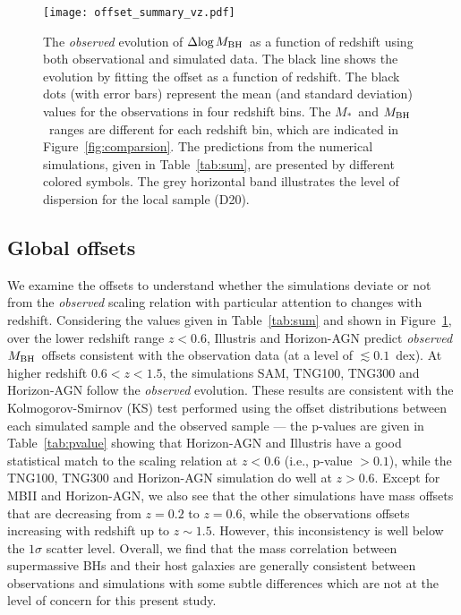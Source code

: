 \documentclass[twocolumn]{aastex631}
\def\smass{{$M_*$}}
\def\mbh{$M_{\rm BH}$}
\begin{document}
\begin{figure}
\centering
\texttt{[image: offset\_summary\_vz.pdf]}
\caption{\label{fig:offsets_vz} 
The {\it observed} evolution of $\Delta{\rm log}$\mbh\ as a function of redshift using both observational and simulated data. The black line shows the evolution by fitting the offset as a function of redshift. The black dots (with error bars) represent the mean (and standard deviation) values for the observations in four redshift bins. The \smass\ and \mbh\ ranges are different for each redshift bin, which are indicated in Figure~\ref{fig:comparsion}. The predictions from the numerical simulations, given in Table~\ref{tab:sum}, are presented by different colored symbols. The grey horizontal band illustrates the level of dispersion for the local sample (D20).
}
\end{figure} 

\subsection{Global offsets}\label{subsec:offset}
We examine the offsets to understand whether the simulations deviate or not from the {\it observed} scaling relation with particular attention to changes with redshift. Considering the values given in Table~\ref{tab:sum} and shown in Figure~\ref{fig:offsets_vz}, over the lower redshift range $z<0.6$, Illustris and Horizon-AGN predict {\it observed} \mbh\ offsets consistent with the observation data (at a level of $\lesssim0.1$~dex). At higher redshift $0.6<z<1.5$, the simulations SAM, TNG100, TNG300 and Horizon-AGN follow the {\it observed} evolution. These results are consistent with the Kolmogorov-Smirnov (KS) test performed using the offset distributions between each simulated sample and the observed sample --- the p-values are given in Table~\ref{tab:pvalue} showing that Horizon-AGN and Illustris have a good statistical match to the scaling relation at $z<0.6$ (i.e., p-value $> 0.1$), while the TNG100, TNG300 and Horizon-AGN simulation do well at $z>0.6$. 
Except for MBII and Horizon-AGN, we also see that the other simulations have mass offsets that are decreasing from $z=0.2$ to $z=0.6$, while the observations offsets increasing with redshift up to $z\sim1.5$. However, this inconsistency is well below the $1\sigma$ scatter level.
Overall, we find that the mass correlation between supermassive BHs and their host galaxies are generally consistent between observations and simulations with some subtle differences which are not at the level of concern for this present study.
\end{document}
